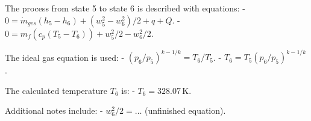 The process from state 5 to state 6 is described with equations:  
- \( 0 = \dot{m}_{ges} \left( h_5 - h_6 \right) + \left( w_5^2 - w_6^2 \right) / 2 + q + Q \).  
- \( 0 = m_f \left( c_p \left( T_5 - T_6 \right) \right) + w_5^2 / 2 - w_6^2 / 2 \).  

The ideal gas equation is used:  
- \( \left( p_6 / p_5 \right)^{k-1 / k} = T_6 / T_5 \).  
- \( T_6 = T_5 \left( p_6 / p_5 \right)^{k-1 / k} \).  

The calculated temperature \( T_6 \) is:  
- \( T_6 = 328.07 \, \text{K} \).  

Additional notes include:  
- \( w_6^2 / 2 = \dots \) (unfinished equation).